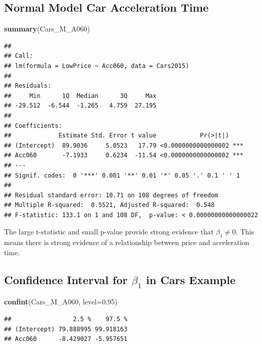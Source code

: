 \documentclass[]{book}
\newenvironment{Shaded}{\begin{snugshade}}{\end{snugshade}}
\newcommand{\KeywordTok}[1]{\textcolor[rgb]{0.13,0.29,0.53}{\textbf{#1}}}
\newcommand{\DataTypeTok}[1]{\textcolor[rgb]{0.13,0.29,0.53}{#1}}
\newcommand{\FloatTok}[1]{\textcolor[rgb]{0.00,0.00,0.81}{#1}}
\newcommand{\NormalTok}[1]{#1}
\begin{document}
\subsection{Normal Model Car Acceleration
Time}\label{normal-model-car-acceleration-time}

\begin{Shaded}
\begin{Highlighting}[]
\KeywordTok{summary}\NormalTok{(Cars_M_A060)}
\end{Highlighting}
\end{Shaded}

\begin{verbatim}
## 
## Call:
## lm(formula = LowPrice ~ Acc060, data = Cars2015)
## 
## Residuals:
##     Min      1Q  Median      3Q     Max 
## -29.512  -6.544  -1.265   4.759  27.195 
## 
## Coefficients:
##             Estimate Std. Error t value            Pr(>|t|)    
## (Intercept)  89.9036     5.0523   17.79 <0.0000000000000002 ***
## Acc060       -7.1933     0.6234  -11.54 <0.0000000000000002 ***
## ---
## Signif. codes:  0 '***' 0.001 '**' 0.01 '*' 0.05 '.' 0.1 ' ' 1
## 
## Residual standard error: 10.71 on 108 degrees of freedom
## Multiple R-squared:  0.5521, Adjusted R-squared:  0.548 
## F-statistic: 133.1 on 1 and 108 DF,  p-value: < 0.00000000000000022
\end{verbatim}

The large t-statistic and small p-value provide strong evidence that
\(\beta_1 \neq 0\). This means there is strong evidence of a
relationship between price and acceleration time.

\subsection{\texorpdfstring{Confidence Interval for \(\beta_1\) in Cars
Example}{Confidence Interval for \textbackslash{}beta\_1 in Cars Example}}\label{confidence-interval-for-beta_1-in-cars-example}

\begin{Shaded}
\begin{Highlighting}[]
\KeywordTok{confint}\NormalTok{(Cars_M_A060, }\DataTypeTok{level=}\FloatTok{0.95}\NormalTok{)}
\end{Highlighting}
\end{Shaded}

\begin{verbatim}
##                 2.5 %    97.5 %
## (Intercept) 79.888995 99.918163
## Acc060      -8.429027 -5.957651
\end{verbatim}
\end{document}
